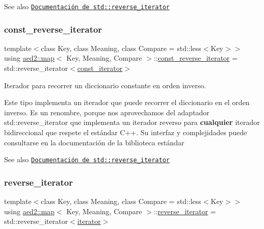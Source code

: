 \begin{DoxySeeAlso}{See also}
\href{http://en.cppreference.com/w/cpp/iterator/reverse_iterator}{\tt Documentación de {\ttfamily std\+::reverse\+\_\+iterator}} 
\end{DoxySeeAlso}
\mbox{\label{classaed2_1_1map_aed66a216549d13078a3ea6978ea0b768}} 
\subsubsection{\texorpdfstring{const\+\_\+reverse\+\_\+iterator}{const\_reverse\_iterator}\hspace{0.1cm}{\footnotesize\ttfamily [2/2]}}
{\footnotesize\ttfamily template$<$class Key, class Meaning, class Compare = std\+::less$<$\+Key$>$$>$ \\
using \hyperlink{classaed2_1_1map}{aed2\+::map}$<$ Key, Meaning, Compare $>$\+::\hyperlink{classaed2_1_1map_aed66a216549d13078a3ea6978ea0b768}{const\+\_\+reverse\+\_\+iterator} =  std\+::reverse\+\_\+iterator$<$\hyperlink{classaed2_1_1map_1_1const__iterator}{const\+\_\+iterator}$>$}



Iterador para recorrer un diccionario constante en orden inverso. 

Este tipo implementa un iterador que puede recorrer el diccionario en el orden inverso. Es un renombre, porque nos aprovechamos del adaptador {\ttfamily std\+::reverse\+\_\+iterator} que implementa un iterador reverso para {\bfseries cualquier} iterador bidireccional que respete el estándar C++. Su interfaz y complejidades puede consultarse en la documentación de la biblioteca estándar

\begin{DoxySeeAlso}{See also}
\href{http://en.cppreference.com/w/cpp/iterator/reverse_iterator}{\tt Documentación de {\ttfamily std\+::reverse\+\_\+iterator}} 
\end{DoxySeeAlso}
\mbox{\label{classaed2_1_1map_a8e6a592062260177fd73b2f9897b1dd5}} 
\subsubsection{\texorpdfstring{reverse\+\_\+iterator}{reverse\_iterator}\hspace{0.1cm}{\footnotesize\ttfamily [1/2]}}
{\footnotesize\ttfamily template$<$class Key, class Meaning, class Compare = std\+::less$<$\+Key$>$$>$ \\
using \hyperlink{classaed2_1_1map}{aed2\+::map}$<$ Key, Meaning, Compare $>$\+::\hyperlink{classaed2_1_1map_a8e6a592062260177fd73b2f9897b1dd5}{reverse\+\_\+iterator} =  std\+::reverse\+\_\+iterator$<$\hyperlink{classaed2_1_1map_1_1iterator}{iterator}$>$}



